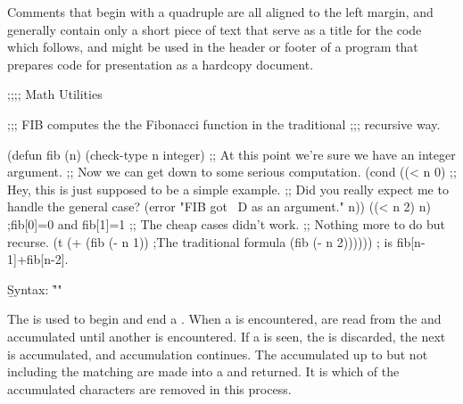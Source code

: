 Comments that begin with a quadruple  are all aligned to
the left margin, and generally contain only a short piece of text that
serve as a title for the code which follows, and might be used in the
header or footer of a program that prepares code for presentation as 
a hardcopy document.

\endsubsubsubsection%


\code
;;;; Math Utilities

;;; FIB computes the the Fibonacci function in the traditional
;;; recursive way.

(defun fib (n)
  (check-type n integer)
  ;; At this point we're sure we have an integer argument.
  ;; Now we can get down to some serious computation.
  (cond ((< n 0)
         ;; Hey, this is just supposed to be a simple example.
         ;; Did you really expect me to handle the general case?
         (error "FIB got ~D as an argument." n))
        ((< n 2) n)             ;fib[0]=0 and fib[1]=1
        ;; The cheap cases didn't work.
        ;; Nothing more to do but recurse.
        (t (+ (fib (- n 1))     ;The traditional formula
              (fib (- n 2)))))) ; is fib[n-1]+fib[n-2].
\endcode

\endsubsubsubsection%

\endsubsubsection%

\endsubsection%


\b{Syntax:} \f{""}


The  is used to begin and end a .
When a  is encountered,
 are read from the   
and accumulated until another  is encountered.
If a   is seen,
the   is discarded,
the next  is accumulated, and accumulation continues.
The accumulated  
up to but not including the matching  
are made into a  and returned.
It is 
which  of the accumulated characters are removed in this process.

